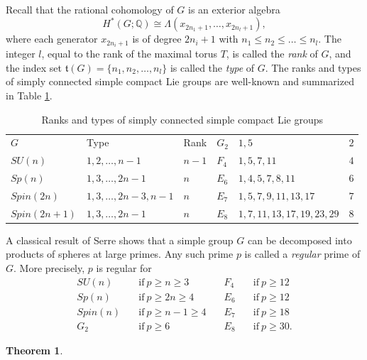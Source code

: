 \documentclass[a4]{amsart}
\newtheorem{theorem}{Theorem}[section]
\theoremstyle{definition}
\begin{document}
\begin{sloppypar}
Recall that the rational cohomology of $G$ is an exterior algebra
\[
H^\ast(G;\mathbb{Q})\cong \Lambda (x_{2n_1+1},\ldots, x_{2n_l+1}),
\]
where each generator $x_{2n_i+1}$ is of degree $2n_i+1$ with $n_1\leq n_2\leq \ldots\leq n_l$. 
The integer $l$, equal to the rank of the maximal torus $T$, is called the {\it rank} of $G$, and the index set $\mathfrak{t}(G)=\{n_1, n_2,\ldots, n_l\}$ is called the {\it type} of $G$. The ranks and types of simply connected simple compact Lie groups are well-known and summarized in Table \ref{tabletypelie}.
\begin{table}[H]
{\begin{tabular}{@{}lll|lll@{}} 
\hline
$G$      & Type & Rank  &   $G_2$        &   $1, 5$  & $2$    \\   
$SU(n)$            & $1, 2, \ldots, n-1$   & $n-1$  &   $F_4$        &   $1, 5, 7, 11$     & $4$  \\
$Sp(n)$            & $1, 3, \ldots, 2n-1$  & $n$        &   $E_6$        &   $1, 4, 5, 7, 8, 11$  & $6$       \\ 
$Spin(2n)$            & $1, 3, \ldots, 2n-3, n-1$ & $n$          &   $E_7$        &   $1, 5, 7, 9, 11, 13, 17$  & $7$     \\ 
$Spin(2n+1)$            & $1, 3, \ldots, 2n-1$ & $n$  &    $E_8$        &   $1, 7, 11, 13, 17, 19, 23, 29$   & $8$ \\      
\hline    
\end{tabular}}
\caption{Ranks and types of simply connected simple compact Lie groups}
\label{tabletypelie}
\end{table}
A classical result of Serre \cite{Ser53} shows that a simple group $G$ can be decomposed into products of spheres at large primes. Any such prime $p$ is called a {\it regular} prime of $G$. More precisely, $p$ is regular for 
\begin{equation}\label{regularpeq}
\begin{array}{llll} 
   SU(n) & \quad\mbox{if}\ p\geq n\geq 3 & \quad F_4 & \quad\mbox{if}\ p\geq 12 \\  
   Sp(n) & \quad\mbox{if}\ p\geq 2n\geq 4 & \quad E_6 & \quad\mbox{if}\ p\geq 12 \\ 
   Spin(n) & \quad\mbox{if}\ p\geq n-1\geq 4 & \quad E_7 & \quad\mbox{if}\ p\geq 18 \\
   G_2 & \quad\mbox{if}\ p\geq 6 & \quad E_8 & \quad\mbox{if}\ p\geq 30.  
\end{array} 
\end{equation} 
\begin{theorem}\label{simpleG/Tthm}

\end{theorem}
\end{sloppypar}
\end{document}
